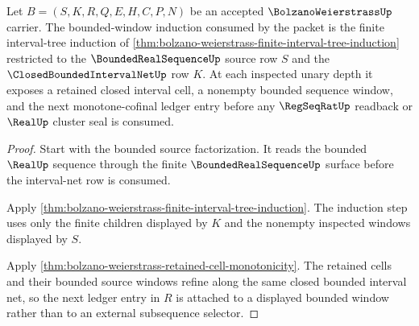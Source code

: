 \begin{theorem}
\label{thm:bolzano-weierstrass-bounded-window-induction}
Let $B=(S,K,R,Q,E,H,C,P,N)$ be an accepted $\BolzanoWeierstrassUp$ carrier. The bounded-window induction consumed by the packet is the finite interval-tree induction of \autoref{thm:bolzano-weierstrass-finite-interval-tree-induction} restricted to the $\BoundedRealSequenceUp$ source row $S$ and the $\ClosedBoundedIntervalNetUp$ row $K$. At each inspected unary depth it exposes a retained closed interval cell, a nonempty bounded sequence window, and the next monotone-cofinal ledger entry before any $\RegSeqRatUp$ readback or $\RealUp$ cluster seal is consumed.
\end{theorem}
\begin{proof}
Start with the bounded source factorization. It reads the bounded $\RealUp$ sequence through the finite $\BoundedRealSequenceUp$ surface before the interval-net row is consumed.

Apply \autoref{thm:bolzano-weierstrass-finite-interval-tree-induction}. The induction step uses only the finite children displayed by $K$ and the nonempty inspected windows displayed by $S$.

Apply \autoref{thm:bolzano-weierstrass-retained-cell-monotonicity}. The retained cells and their bounded source windows refine along the same closed bounded interval net, so the next ledger entry in $R$ is attached to a displayed bounded window rather than to an external subsequence selector.
\end{proof}

